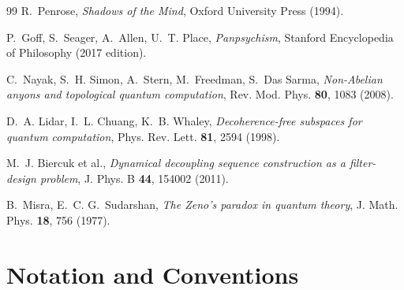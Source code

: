 \documentclass[12pt,letterpaper]{article}
\begin{document}
\begin{thebibliography}{99}
R.~Penrose,
\textit{Shadows of the Mind},
Oxford University Press (1994).

P.~Goff, S.~Seager, A.~Allen, U.~T. Place,
\textit{Panpsychism},
Stanford Encyclopedia of Philosophy (2017 edition).

C.~Nayak, S.~H. Simon, A.~Stern, M.~Freedman, S.~Das Sarma,
\textit{Non-Abelian anyons and topological quantum computation},
Rev. Mod. Phys. \textbf{80}, 1083 (2008).

D.~A. Lidar, I.~L. Chuang, K.~B. Whaley,
\textit{Decoherence-free subspaces for quantum computation},
Phys. Rev. Lett. \textbf{81}, 2594 (1998).

M.~J. Biercuk et al.,
\textit{Dynamical decoupling sequence construction as a filter-design problem},
J. Phys. B \textbf{44}, 154002 (2011).

B.~Misra, E.~C. G.~Sudarshan,
\textit{The Zeno's paradox in quantum theory},
J. Math. Phys. \textbf{18}, 756 (1977).

\end{thebibliography}

\appendix

\section{Notation and Conventions}
\label{app:notation}
\end{document}
